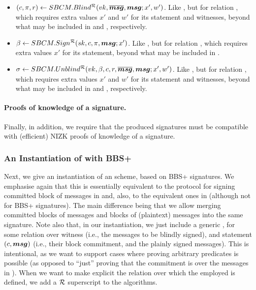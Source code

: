 \begin{itemize}
\item $(c,\pi,r) \gets SBCM.Blind^\mathcal{R}(vk,\overline{\boldsymbol{msg}},\boldsymbol{msg};x',w')$. Like
  \SBCMBlind, but for relation \NIZKRel, which requires extra values $x'$ and
  $w'$ for its statement and witnesses, beyond what may be included in \smsg and
  \osmsg, respectively.
\item $\beta \gets SBCM.Sign^\mathcal{R}(sk,c,\pi,\boldsymbol{msg};x')$. Like
  \SBCMSign, but for relation \NIZKRel, which requires extra values $x'$
  for its statement, beyond what may be included in \smsg.
\item $\sigma \gets SBCM.Unblind^\mathcal{R}(vk,\beta,c,r,\overline{\boldsymbol{msg}},\boldsymbol{msg};
  x',w')$. Like \SBCMUnblind, but for relation \NIZKRel, which requires extra
  values $x'$ and $w'$ for its statement and witnesses, beyond what may be
  included in \smsg and \osmsg, respectively.
\end{itemize}

\paragraph{Proofs of knowledge of a \SBCM signature.} %
Finally, in addition, we require that the produced signatures must be compatible
with (efficient) NIZK proofs of knowledge of a signature.

\subsubsection{An Instantiation of \SBCM with BBS+}

Next, we give an instantiation of an \SBCM scheme, based on BBS+ signatures.
We emphasise again that this is essentially equivalent to the protocol for
signing committed block of messages in \cite{asm06} and, also, to the equivalent
ones in \cite{cl02,ps16} (although not for BBS+ signatures). The main difference
being that we allow merging committed blocks of messages and blocks of
(plaintext) messages into the same signature.
%
Note also that, in our instantiation, we just include a generic \NIZK, for some
relation over witness \osmsg (i.e., the messages to be blindly
signed), and statement $(c,\boldsymbol{msg})$ (i.e., their block commitment, and the
plainly signed messages). This is intentional, as we want to support cases where
proving arbitrary predicates is possible (as opposed to ``just'' proving that
the commitment is over the messages in \osmsg).
%
When we want to make explicit the relation over which the employed \NIZK is
defined, we add a $\mathcal{R}$ superscript to the algorithms.

